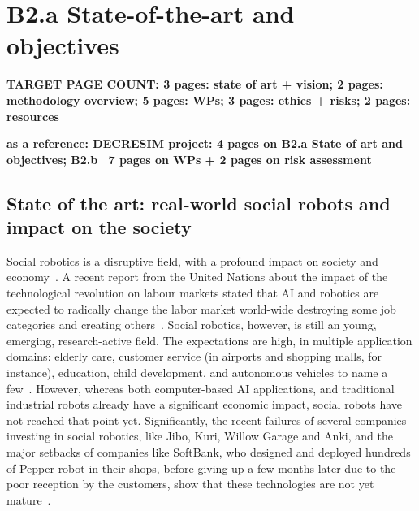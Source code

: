 \documentclass[11pt,a4paper]{report}
\newcommand{\TODO}[1]{{\color{red}\textbf{#1}}}
\newcommand{\eu}[1]{}
\begin{document}
\chapter{B2.a State-of-the-art and objectives}

\eu{(B2.a, B2.b, B2.c: max 15 pages (2 pages for B2.c)}
\eu{Specify the proposal objectives in the context of the state
of the art in the research field. It should be clear how and why the proposed work is important for
the field, and what impact it will have if successful, such as how it may open up new horizons or
opportunities for science, technology or scholarship. Specify any particularly challenging or
unconventional aspects of the proposal, including multi- or inter-disciplinary aspects.}

\TODO{TARGET PAGE COUNT: 3 pages: state of art + vision; 2 pages: methodology overview; 5 pages:
WPs; 3 pages: ethics + risks; 2 pages: resources}

\TODO{as a reference: DECRESIM project: 4 pages on B2.a State of art and
objectives; B2.b ~7 pages on WPs + 2 pages on risk assessment}



\section{State of the art: real-world social robots and impact on the
society}

Social robotics is a disruptive field, with a profound impact on society and
economy~\cite{williams2020social}. A recent report from the United Nations about
the impact of the technological revolution on labour markets stated that AI and
robotics are expected to radically change the labor market world-wide destroying
some job categories and creating others~\cite{bruckner2017frontier}. Social
robotics, however, is still an young, emerging, research-active field. The
expectations are high, in multiple application domains: elderly care, customer
service (in airports and shopping malls, for instance), education, child
development, and autonomous vehicles to name a few~\cite{baillie2019challenges}.
However, whereas both computer-based AI applications, and traditional industrial
robots already have a significant economic impact, social robots have not
reached that point yet. Significantly, the recent failures of several companies
investing in social robotics, like Jibo, Kuri, Willow Garage and Anki, and the
major setbacks of companies like SoftBank, who designed and deployed hundreds of
Pepper robot in their shops, before giving up a few months later due to the poor
reception by the customers, show that these technologies are not yet
mature~\cite{tulli2019great}.
\end{document}
